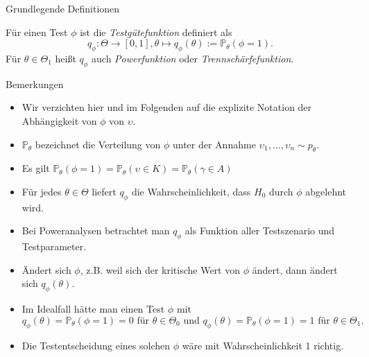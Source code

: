\documentclass[
  8pt,
  ignorenonframetext,
]{beamer}
\providecommand{\tightlist}{%
  \setlength{\itemsep}{0pt}\setlength{\parskip}{0pt}}
\newcommand{\ups} {\upsilon}
\begin{document}
\begin{frame}{Grundlegende Definitionen}
\protect\hypertarget{grundlegende-definitionen-9}{}
\small
\begin{definition}[Testgütefunktion]
\justifying
Für einen Test $\phi$ ist die \textit{Testgütefunktion} definiert als
\begin{equation}
q_{\phi} : \Theta \to [0,1], \theta \mapsto q_{\phi}(\theta) := \mathbb{P}_\theta(\phi = 1).
\end{equation}
Für $\theta \in \Theta_1$ heißt $q_\phi$ auch \textit{Powerfunktion} oder
\textit{Trennschärfefunktion}.
\end{definition}
\footnotesize

Bemerkungen

\begin{itemize}
\tightlist
\item
  Wir verzichten hier und im Folgenden auf die explizite Notation der
  Abhängigkeit von \(\phi\) von \(\ups\).
\item
  \(\mathbb{P}_\theta\) bezeichnet die Verteilung von \(\phi\) unter der
  Annahme \(\ups_1,...,\ups_n \sim p_\theta\).
\item
  Es gilt
  \(\mathbb{P}_\theta(\phi = 1) = \mathbb{P}_\theta (\ups \in K) = \mathbb{P}_\theta(\gamma \in A)\)
\item
  Für jedes \(\theta \in \Theta\) liefert \(q_\phi\) die
  Wahrscheinlichkeit, dass \(H_0\) durch \(\phi\) abgelehnt wird.
\item
  Bei Poweranalysen betrachtet man \(q_{\phi}\) als Funktion aller
  Testszenario und Testparameter.
\item
  Ändert sich \(\phi\), z.B. weil sich der kritische Wert von \(\phi\)
  ändert, dann ändert sich \(q_{\phi}(\theta)\).
\item
  Im Idealfall hätte man einen Test \(\phi\) mit \begin{equation}
  q_\phi(\theta) = \mathbb{P}_\theta(\phi = 1) = 0 \mbox{ für } \theta \in \Theta_0 \mbox{ und }
  q_\phi(\theta) = \mathbb{P}_\theta(\phi = 1) = 1 \mbox{ für } \theta \in \Theta_1.
  \end{equation}
\item
  Die Testentscheidung eines solchen \(\phi\) wäre mit
  Wahrscheinlichkeit 1 richtig.
\end{itemize}
\end{frame}
\end{document}
